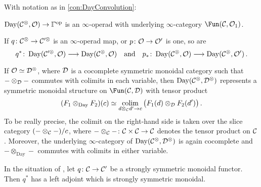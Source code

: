 \begin{prop}\label{prop:DayConvolution}
	With notation as in \cref{con:DayConvolution}:
	\begin{alphanumerate}
		\item $\operatorname{Day}(\Cc^\otimes,\Oo)\morphism \IGamma^\op$ is an $\infty$-operad with underlying $\infty$-category $\Fun(\Cc,\Oo_1)$.
		\item If $q\colon \Cc^\otimes\morphism \Cc'^\otimes$ is an $\infty$-operad map, or $p\colon \Oo\morphism\Oo'$ is one, so are
		\begin{equation*}
			q^*\colon \operatorname{Day}(\Cc'^\otimes,\Oo)\morphism\operatorname{Day}(\Cc^\otimes,\Oo)\quad\text{and}\quad p_*\colon \operatorname{Day}(\Cc^\otimes,\Oo)\morphism \operatorname{Day}(\Cc^\otimes,\Oo')\,.
		\end{equation*}
		\item If $\mathcal{O}\simeq \mathcal{D}^\otimes$, where $\mathcal{D}$ is a cocomplete symmetric monoidal category such that $-\otimes_{\mathcal{D}} -$ commutes with colimits in each variable, then $\operatorname{Day}(\mathcal{C}^\otimes,\mathcal{D}^\otimes)$ represents a symmetric monoidal structure on $\Fun(\Cc,\Dd)$ with tensor product
		\begin{equation*}
			(F_1\otimes_{\operatorname{Day}} F_2)(c)\simeq \colimit_{d\otimes_\Cc d'\morphism c} \big(F_1(d)\otimes_\Dd F_2(d')\big)\,.
		\end{equation*}
		To be really precise, the colimit on the right-hand side is taken over the slice category $(-\otimes_{\mathcal{C}} -)/c$, where $-\otimes_\Cc-\colon \Cc\times\Cc\morphism\Cc$ denotes the tensor product on $\mathcal{C}$. Moreover, the underlying $\infty$-category of $\operatorname{Day}(\mathcal{C}^\otimes,\mathcal{D}^\otimes)$ is again cocomplete and $-\otimes_{\operatorname{Day}}-$ commutes with colimits in either variable.
		
		\item In the situation of , let $q\colon \Cc\morphism \Cc'$ be a strongly symmetric monoidal functor. Then $q^*$ has a left adjoint  which is strongly symmetric monoidal.
	\end{alphanumerate}
\end{prop}
